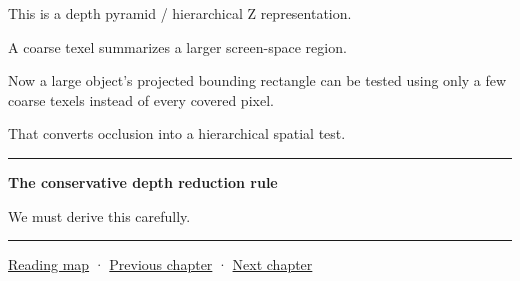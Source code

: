 This is a depth pyramid / hierarchical Z representation.

A coarse texel summarizes a larger screen-space region.

Now a large object's projected bounding rectangle can be tested using only a few coarse texels instead of every covered pixel.

That converts occlusion into a hierarchical spatial test.

\begin{center}\rule{0.5\linewidth}{0.5pt}\end{center}

\textbf{The conservative depth reduction rule}

We must derive this carefully.

\begin{center}\rule{0.5\linewidth}{0.5pt}\end{center}

\hyperref[volume-reading-map]{Reading map} · \hyperref[06-engine-ii-ch028]{Previous chapter} · \hyperref[06-engine-ii-ch030]{Next chapter}
